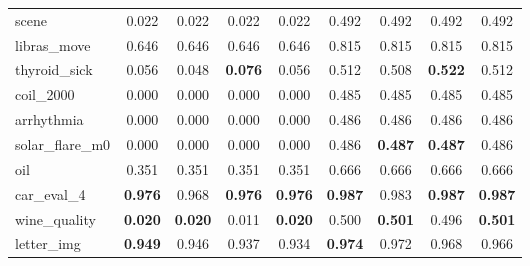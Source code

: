 \begin{figure}[ht]
\begin{tabular}{p{22mm}|*4{p{14mm}}|*4{p{14mm}}}
        scene&\multicolumn{1}{c}{0.022}&\multicolumn{1}{c}{0.022}&\multicolumn{1}{c}{0.022}&\multicolumn{1}{c|}{0.022}&\multicolumn{1}{c}{0.492}&\multicolumn{1}{c}{0.492}&\multicolumn{1}{c}{0.492}&\multicolumn{1}{c}{0.492}\\
        libras\_move&\multicolumn{1}{c}{0.646}&\multicolumn{1}{c}{0.646}&\multicolumn{1}{c}{0.646}&\multicolumn{1}{c|}{0.646}&\multicolumn{1}{c}{0.815}&\multicolumn{1}{c}{0.815}&\multicolumn{1}{c}{0.815}&\multicolumn{1}{c}{0.815}\\
        thyroid\_sick&\multicolumn{1}{c}{0.056}&\multicolumn{1}{c}{0.048}&\multicolumn{1}{c}{\textbf{0.076}}&\multicolumn{1}{c|}{0.056}&\multicolumn{1}{c}{0.512}&\multicolumn{1}{c}{0.508}&\multicolumn{1}{c}{\textbf{0.522}}&\multicolumn{1}{c}{0.512}\\
        coil\_2000&\multicolumn{1}{c}{0.000}&\multicolumn{1}{c}{0.000}&\multicolumn{1}{c}{0.000}&\multicolumn{1}{c|}{0.000}&\multicolumn{1}{c}{0.485}&\multicolumn{1}{c}{0.485}&\multicolumn{1}{c}{0.485}&\multicolumn{1}{c}{0.485}\\
        arrhythmia&\multicolumn{1}{c}{0.000}&\multicolumn{1}{c}{0.000}&\multicolumn{1}{c}{0.000}&\multicolumn{1}{c|}{0.000}&\multicolumn{1}{c}{0.486}&\multicolumn{1}{c}{0.486}&\multicolumn{1}{c}{0.486}&\multicolumn{1}{c}{0.486}\\
        solar\_flare\_m0&\multicolumn{1}{c}{0.000}&\multicolumn{1}{c}{0.000}&\multicolumn{1}{c}{0.000}&\multicolumn{1}{c|}{0.000}&\multicolumn{1}{c}{0.486}&\multicolumn{1}{c}{\textbf{0.487}}&\multicolumn{1}{c}{\textbf{0.487}}&\multicolumn{1}{c}{0.486}\\
        oil&\multicolumn{1}{c}{0.351}&\multicolumn{1}{c}{0.351}&\multicolumn{1}{c}{0.351}&\multicolumn{1}{c|}{0.351}&\multicolumn{1}{c}{0.666}&\multicolumn{1}{c}{0.666}&\multicolumn{1}{c}{0.666}&\multicolumn{1}{c}{0.666}\\
        car\_eval\_4&\multicolumn{1}{c}{\textbf{0.976}}&\multicolumn{1}{c}{0.968}&\multicolumn{1}{c}{\textbf{0.976}}&\multicolumn{1}{c|}{\textbf{0.976}}&\multicolumn{1}{c}{\textbf{0.987}}&\multicolumn{1}{c}{0.983}&\multicolumn{1}{c}{\textbf{0.987}}&\multicolumn{1}{c}{\textbf{0.987}}\\
        wine\_quality&\multicolumn{1}{c}{\textbf{0.020}}&\multicolumn{1}{c}{\textbf{0.020}}&\multicolumn{1}{c}{0.011}&\multicolumn{1}{c|}{\textbf{0.020}}&\multicolumn{1}{c}{0.500}&\multicolumn{1}{c}{\textbf{0.501}}&\multicolumn{1}{c}{0.496}&\multicolumn{1}{c}{\textbf{0.501}}\\
        letter\_img&\multicolumn{1}{c}{\textbf{0.949}}&\multicolumn{1}{c}{0.946}&\multicolumn{1}{c}{0.937}&\multicolumn{1}{c|}{0.934}&\multicolumn{1}{c}{\textbf{0.974}}&\multicolumn{1}{c}{0.972}&\multicolumn{1}{c}{0.968}&\multicolumn{1}{c}{0.966}\\

\end{tabular}
\end{figure}
